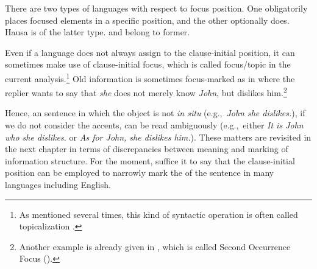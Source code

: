 


\noindent There are two types of languages with respect to focus
position. One obligatorily places focused elements in a specific
position, and the other optionally does. Hausa is of the latter type.
 and  belong to former.  


Even if a language does not always assign  to the clause-initial
position, it can sometimes make use of clause-initial focus, which is
called focus/topic  in the current analysis.\footnote{As
  mentioned several times, this kind of syntactic operation is often
  called topicalization \citep{prince:84,man:07}.}  Old information is
sometimes focus-marked as in 
where the replier wants to say that \textit{she} does not merely know
\textit{John}, but dislikes him.\footnote{Another example is already
  given in , which is called Second
  Occurrence Focus ().}



\noindent Hence, an  sentence in which the object is not
\textit{in situ} (e.g.,\ \textit{John she dislikes.}), if we do not
consider the accents, can be read ambiguously (e.g.,\ either
\textit{It is John who she dislikes.} or \textit{As for John, she
  dislikes him.}).  These matters are revisited in the next chapter in
terms of discrepancies between meaning and marking of information
structure.
For the moment, suffice it to say that the clause-initial
position can be employed to narrowly mark the  of the sentence in
many languages including English.


